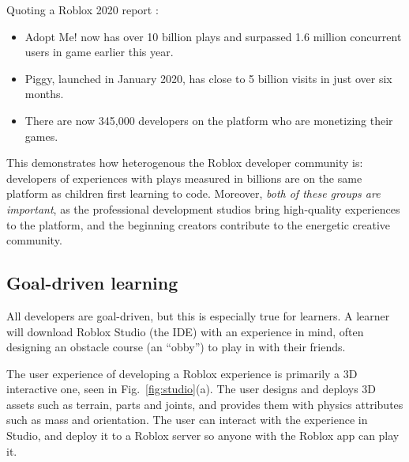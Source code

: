 \documentclass[acmsmall]{acmart}
\begin{document}
Quoting a Roblox 2020 report \cite{RobloxDevelopers}:
\begin{itemize}
\item Adopt Me! now has over 10 billion plays and surpassed 1.6 million concurrent users in game earlier this year.
\item Piggy, launched in January 2020, has close to 5 billion visits in just over six months.
\item There are now 345,000 developers on the platform who are monetizing their games.
\end{itemize}
This demonstrates how heterogenous the Roblox developer community is:
developers of experiences with plays measured in billions are on the same
platform as children first learning to code. Moreover, \emph{both of
these groups are important}, as the professional development studios
bring high-quality experiences to the platform, and the beginning creators
contribute to the energetic creative community.

\subsection{Goal-driven learning}

All developers are goal-driven, but this is especially true for
learners. A learner will download Roblox Studio (the IDE) with an
experience in mind, often designing an obstacle course (an ``obby'')
to play in with their friends.

The user experience of developing a Roblox experience is primarily a
3D interactive one, seen in Fig.~\ref{fig:studio}(a). The user designs
and deploys 3D assets such as terrain, parts and joints, and provides
them with physics attributes such as mass and orientation. The user
can interact with the experience in Studio, and deploy it to a Roblox
server so anyone with the Roblox app can play it.
\end{document}
